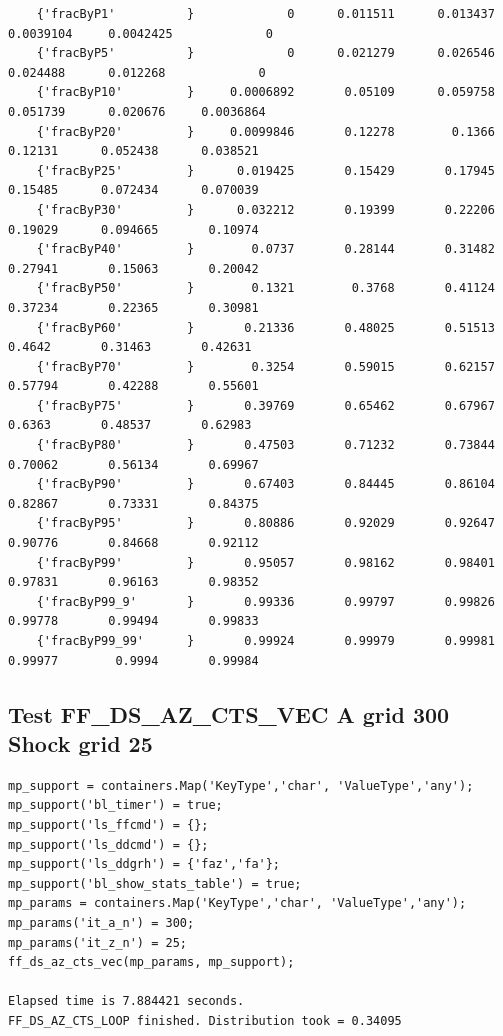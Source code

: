 \documentclass[
]{book}
\begin{document}
\begin{verbatim}
    {'fracByP1'          }             0      0.011511      0.013437     0.0039104     0.0042425             0 
    {'fracByP5'          }             0      0.021279      0.026546      0.024488      0.012268             0 
    {'fracByP10'         }     0.0006892       0.05109      0.059758      0.051739      0.020676     0.0036864 
    {'fracByP20'         }     0.0099846       0.12278        0.1366       0.12131      0.052438      0.038521 
    {'fracByP25'         }      0.019425       0.15429       0.17945       0.15485      0.072434      0.070039 
    {'fracByP30'         }      0.032212       0.19399       0.22206       0.19029      0.094665       0.10974 
    {'fracByP40'         }        0.0737       0.28144       0.31482       0.27941       0.15063       0.20042 
    {'fracByP50'         }        0.1321        0.3768       0.41124       0.37234       0.22365       0.30981 
    {'fracByP60'         }       0.21336       0.48025       0.51513        0.4642       0.31463       0.42631 
    {'fracByP70'         }        0.3254       0.59015       0.62157       0.57794       0.42288       0.55601 
    {'fracByP75'         }       0.39769       0.65462       0.67967        0.6363       0.48537       0.62983 
    {'fracByP80'         }       0.47503       0.71232       0.73844       0.70062       0.56134       0.69967 
    {'fracByP90'         }       0.67403       0.84445       0.86104       0.82867       0.73331       0.84375 
    {'fracByP95'         }       0.80886       0.92029       0.92647       0.90776       0.84668       0.92112 
    {'fracByP99'         }       0.95057       0.98162       0.98401       0.97831       0.96163       0.98352 
    {'fracByP99_9'       }       0.99336       0.99797       0.99826       0.99778       0.99494       0.99833 
    {'fracByP99_99'      }       0.99924       0.99979       0.99981       0.99977        0.9994       0.99984 
\end{verbatim}

\hypertarget{test-ff_ds_az_cts_vec-a-grid-300-shock-grid-25}{%
\subsection{Test FF\_DS\_AZ\_CTS\_VEC A grid 300 Shock grid 25}\label{test-ff_ds_az_cts_vec-a-grid-300-shock-grid-25}}

\begin{verbatim}
mp_support = containers.Map('KeyType','char', 'ValueType','any');
mp_support('bl_timer') = true;
mp_support('ls_ffcmd') = {};
mp_support('ls_ddcmd') = {};
mp_support('ls_ddgrh') = {'faz','fa'};
mp_support('bl_show_stats_table') = true;
mp_params = containers.Map('KeyType','char', 'ValueType','any');
mp_params('it_a_n') = 300;
mp_params('it_z_n') = 25;
ff_ds_az_cts_vec(mp_params, mp_support);

Elapsed time is 7.884421 seconds.
FF_DS_AZ_CTS_LOOP finished. Distribution took = 0.34095
\end{verbatim}
\end{document}
